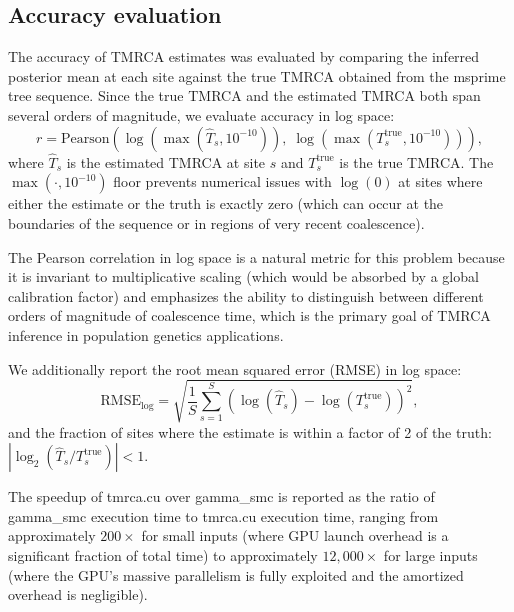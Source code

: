 \documentclass[10pt,letterpaper]{article}
\begin{document}
\subsection{Accuracy evaluation}

The accuracy of TMRCA estimates was evaluated by comparing the inferred posterior mean at each site against the true TMRCA obtained from the msprime tree sequence. Since the true TMRCA and the estimated TMRCA both span several orders of magnitude, we evaluate accuracy in log space:
\begin{equation}
r = \mathrm{Pearson}\!\left(\log\!\left(\max(\hat{T}_s, 10^{-10})\right),\; \log\!\left(\max(T_s^{\mathrm{true}}, 10^{-10})\right)\right),
\end{equation}
where $\hat{T}_s$ is the estimated TMRCA at site $s$ and $T_s^{\mathrm{true}}$ is the true TMRCA. The $\max(\cdot, 10^{-10})$ floor prevents numerical issues with $\log(0)$ at sites where either the estimate or the truth is exactly zero (which can occur at the boundaries of the sequence or in regions of very recent coalescence).

The Pearson correlation in log space is a natural metric for this problem because it is invariant to multiplicative scaling (which would be absorbed by a global calibration factor) and emphasizes the ability to distinguish between different orders of magnitude of coalescence time, which is the primary goal of TMRCA inference in population genetics applications.

We additionally report the root mean squared error (RMSE) in log space:
\begin{equation}
\mathrm{RMSE}_{\log} = \sqrt{\frac{1}{S}\sum_{s=1}^{S}\left(\log(\hat{T}_s) - \log(T_s^{\mathrm{true}})\right)^2},
\end{equation}
and the fraction of sites where the estimate is within a factor of 2 of the truth: $|\log_2(\hat{T}_s / T_s^{\mathrm{true}})| < 1$.

The speedup of tmrca.cu over gamma\_smc is reported as the ratio of gamma\_smc execution time to tmrca.cu execution time, ranging from approximately $200\times$ for small inputs (where GPU launch overhead is a significant fraction of total time) to approximately $12{,}000\times$ for large inputs (where the GPU's massive parallelism is fully exploited and the amortized overhead is negligible).



\end{document}
